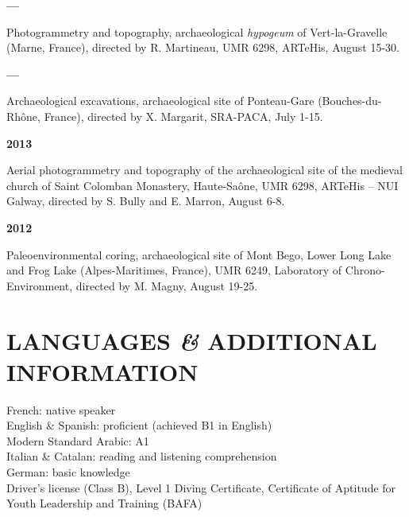 \documentclass{article}
\newcommand{\fr}[1]{} %
\newcommand{\en}[1]{#1}   %
\begin{document}
\smallbreak
\textbf{--- }
\fr{Photogrammétrie et topographie, \textit{hypogée} archéologique de Vert-la-Gravelle (Marne, France), dir. R. Martineau, UMR 6298, ARTeHis, 15-30 août.}
\en{Photogrammetry and topography, archaeological \textit{hypogeum} of Vert-la-Gravelle (Marne, France), directed by R. Martineau, UMR 6298, ARTeHis, August 15-30.}

\smallbreak
\textbf{---}
\fr{Fouilles archéologiques, site archéologique de Ponteau-Gare (Bouches-du-Rhône, France), dir. X. Margarit, SRA-PACA, 1-15 juillet.}
\en{Archaeological excavations, archaeological site of Ponteau-Gare (Bouches-du-Rhône, France), directed by X. Margarit, SRA-PACA, July 1-15.}

\smallbreak
\textbf{2013}
\fr{Photogrammétrie aérienne et topographie du site archéologique de l'église médiévale du monastère de Saint Colomban, Haute-Saône, UMR 6298, ARTeHis -- NUI Galway, dir. S. Bully et E. Marron, 6-8 août.}
\en{Aerial photogrammetry and topography of the archaeological site of the medieval church of Saint Colomban Monastery, Haute-Saône, UMR 6298, ARTeHis -- NUI Galway, directed by S. Bully and E. Marron, August 6-8.}

\smallbreak
\textbf{2012}
\fr{Carottage paléoenvironnemental, site archéologique du mont Bego, Lac Long Inférieur et Lac des Grenouilles (Alpes-Maritimes, France), UMR 6249, Laboratoire Chrono-Environnement, dir. M. Magny, 19-25 août.}
\en{Paleoenvironmental coring, archaeological site of Mont Bego, Lower Long Lake and Frog Lake (Alpes-Maritimes, France), UMR 6249, Laboratory of Chrono-Environment, directed by M. Magny, August 19-25.}

\section*{\fr{LANGUES \textit{\&} INFORMATIONS COMPLÉMENTAIRES}\en{LANGUAGES \textit{\&} ADDITIONAL INFORMATION}}

\fr{Français : langue maternelle \\
Anglais \& Espagnol : bon niveau (obtenu B1 en Anglais) \\
Arabe standard moderne : A1 \\
Italien \& Catalan : compréhension écrite et orale \\
Allemand : notions \\

Permis de conduire (permis B), Niveau 1 de plongée, Diplôme de Capacité d'Animation (BAFA)}
\en{French: native speaker \\
English \& Spanish: proficient (achieved B1 in English) \\
Modern Standard Arabic: A1 \\
Italian \& Catalan: reading and listening comprehension \\
German: basic knowledge \\

Driver's license (Class B), Level 1 Diving Certificate, Certificate of Aptitude for Youth Leadership and Training (BAFA)}
\end{document}
